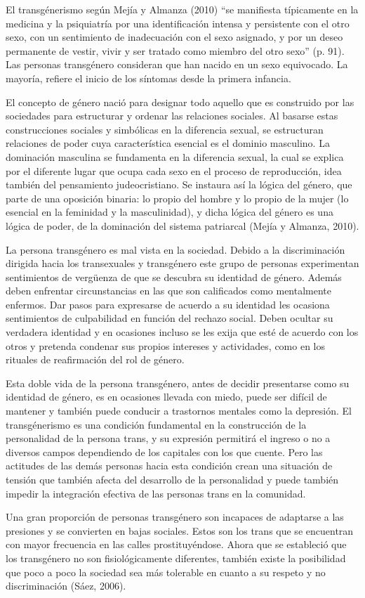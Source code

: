 El transgénerismo según Mejía y Almanza (2010) “se manifiesta típicamente en la
medicina y la psiquiatría por una identificación intensa y persistente con el
otro sexo, con un sentimiento de inadecuación con el sexo asignado, y por un
deseo permanente de vestir, vivir y ser tratado como miembro del otro sexo” (p.
91). Las personas transgénero consideran que han nacido en un sexo equivocado.
La mayoría, refiere el inicio de los síntomas desde la primera infancia.

El concepto de género nació para designar todo aquello que es construido por las
sociedades para estructurar y ordenar las relaciones sociales. Al basarse estas
construcciones sociales y simbólicas en la diferencia sexual, se estructuran
relaciones de poder cuya característica esencial es el dominio masculino. La
dominación masculina se fundamenta en la diferencia sexual, la cual se explica
por el diferente lugar que ocupa cada sexo en el proceso de reproducción, idea
también del pensamiento judeocristiano. Se instaura así la lógica del género,
que parte de una oposición binaria: lo propio del hombre y lo propio de la mujer
(lo esencial en la feminidad y la masculinidad), y dicha lógica del género es
una lógica de poder, de la dominación del sistema patriarcal (Mejía y Almanza,
2010).

La persona transgénero es mal vista en la sociedad. Debido a la discriminación
dirigida hacia los transexuales y transgénero este grupo de personas
experimentan sentimientos de vergüenza de que se descubra su identidad de
género. Además deben enfrentar circunstancias en las que son calificados como
mentalmente enfermos. Dar pasos para expresarse de acuerdo a su identidad les
ocasiona sentimientos de culpabilidad en función del rechazo social. Deben
ocultar su verdadera identidad y en ocasiones incluso se les exija que esté de
acuerdo con los otros y pretenda condenar sus propios intereses y actividades,
como en los rituales de reafirmación del rol de género.

Esta doble vida de la persona transgénero, antes de decidir presentarse como su
identidad de género, es en ocasiones llevada con miedo, puede ser difícil de
mantener y también puede conducir a trastornos mentales como la depresión. El
transgénerismo es una condición fundamental en la construcción de la
personalidad de la persona trans, y su expresión permitirá el ingreso o no a
diversos campos dependiendo de los capitales con los que cuente. Pero las
actitudes de las demás personas hacia esta condición crean una situación de
tensión que también afecta del desarrollo de la personalidad y puede también
impedir la integración efectiva de las personas trans en la comunidad.

Una gran proporción de personas transgénero son incapaces de adaptarse a las
presiones y se convierten en bajas sociales. Estos son los trans que se
encuentran con mayor frecuencia en las calles prostituyéndose. Ahora que se
estableció que los transgénero no son fisiológicamente diferentes, también
existe la posibilidad que poco a poco la sociedad sea más tolerable en cuanto a
su respeto y no discriminación (Sáez, 2006).
